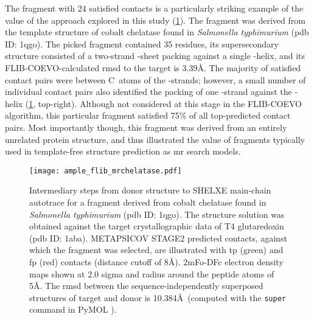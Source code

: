 The fragment with 24 satisfied contacts is a particularly striking example of the value of the approach explored in this study (\cref{fig:ample_flib_mrchelatase}). The fragment was derived from the template structure of cobalt chelatase found in \textit{Salmonella typhimurium} (\gls{pdb} ID: 1qgo). The picked fragment contained 35 residues, its supersecondary structure consisted of a two-strand \textbeta-sheet packing against a single \textalpha-helix, and its FLIB-COEVO-calculated \gls{rmsd} to the target is 3.39\AA. The majority of satisfied contact pairs were between C\textbeta\ atoms of the \textbeta-strands; however, a small number of individual contact pairs also identified the packing of one \textbeta-strand against the \textalpha-helix (\cref{fig:ample_flib_mrchelatase}, top-right). Although not considered at this stage in the FLIB-COEVO algorithm, this particular fragment satisfied 75\% of all top-predicted contact pairs. Most importantly though, this fragment was derived from an entirely unrelated protein structure, and thus illustrated the value of fragments typically used in template-free structure prediction as \gls{mr} search models.

\begin{figure}[H]
	\centering
	\texttt{[image: ample\_flib\_mrchelatase.pdf]}
	\caption[Example of FLIB-COEVO fragment to MR solution]{Intermediary steps from donor structure to SHELXE main-chain autotrace for a fragment derived from cobalt chelatase found in \textit{Salmonella typhimurium} (\gls{pdb} ID: 1qgo). The structure solution was obtained against the target crystallographic data of T4 glutaredoxin (\gls{pdb} ID: 1aba). METAPSICOV STAGE2 predicted contacts, against which the fragment was selected, are illustrated with \acrlong{tp} (green) and \acrlong{fp} (red) contacts (distance cutoff of 8\AA). 2mFo-DFc electron density maps shown at 2.0 sigma and radius around the peptide atoms of 5\AA. The \gls{rmsd} between the sequence-independently superposed structures of target and donor is 10.384\AA\ (computed with the \texttt{super} command in PyMOL \cite{Delano2002-hm}).}
	\label{fig:ample_flib_mrchelatase}
\end{figure}

